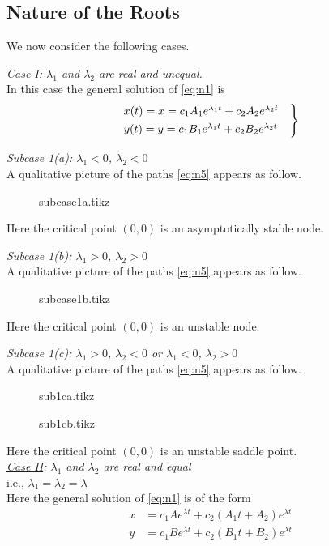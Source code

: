 \documentclass[../main-sheet.tex]{subfiles}
\begin{document}
\subsection{Nature of the Roots}
We now consider the following cases.


\emph{\underline{Case I}: \(\lambda_1\) and \(\lambda_2\) are real and unequal.}\\
In this case the general solution of \eqref{eq:n1} is
\begin{equation}
    \begin{rcases}
        {x}(t)=x=c_1A_1e^{\lambda_1 t}+c_2A_2e^{\lambda_2 t}\quad\\
        {y}(t)=y=c_1B_1e^{\lambda_1 t}+c_2B_2e^{\lambda_2 t}
    \end{rcases}
    \label{eq:n5}
\end{equation}


\emph{Subcase 1(a): \(\lambda_1<0\), \(\lambda_2<0\)}\\
A qualitative picture of the paths \eqref{eq:n5} appears as follow.
\begin{figure}[H]
    \centering
    {subcase1a.tikz}
\end{figure}
Here the critical point \((0,0)\) is an asymptotically stable node.


\emph{Subcase 1(b): \(\lambda_1>0\), \(\lambda_2>0\)}\\
A qualitative picture of the paths \eqref{eq:n5} appears as follow.
\begin{figure}[H]
    \centering
    {subcase1b.tikz}
\end{figure}
Here the critical point \((0,0)\) is an unstable node.


\emph{Subcase 1(c): \(\lambda_1>0\), \(\lambda_2<0\) or \(\lambda_1<0\), \(\lambda_2>0\)}\\
A qualitative picture of the paths \eqref{eq:n5} appears as follow.
\begin{figure}[H]
    \centering
    \begin{minipage}[c]{.45\textwidth}
        {sub1ca.tikz}
    \end{minipage}
    \begin{minipage}[c]{.45\textwidth}
        {sub1cb.tikz}
    \end{minipage}
\end{figure}
Here the critical point \((0,0)\) is an unstable saddle point.\\

\emph{\underline{Case II}: \(\lambda_1\) and \(\lambda_2\) are real and equal}\\
i.e., \(\lambda_1=\lambda_2=\lambda\)\\
Here the general solution of \eqref{eq:n1} is of the form
\begin{align*}
    x&=c_1A e^{\lambda t}+c_2(A_1 t+A_2)e^{\lambda t}\\
    y&=c_1B e^{\lambda t}+c_2(B_1 t+B_2)e^{\lambda t}
\end{align*}
\end{document}
